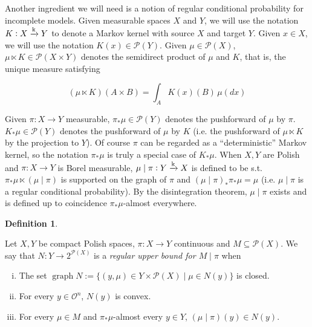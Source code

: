 \documentclass[11pt]{article}
\theoremstyle{definition}
\newtheorem{definition}{Definition}%
\theoremstyle{plain}
\newcommand{\M}{\xrightarrow{\textnormal{k}}}
\DeclareMathOperator{\Gr}{graph}
\newcommand{\PM}{\mathcal{P}}
\newcommand{\Ob}{\mathcal{O}}
\begin{document}
Another ingredient we will need is a notion of regular conditional probability for incomplete models. Given measurable spaces $X$ and $Y$, we will use the notation $K: X \M Y$ to denote a Markov kernel with source $X$ and target $Y$. Given $x \in X$, we will use the notation $K\left(x\right) \in \PM\left(Y\right)$. Given $\mu \in \PM\left(X\right)$, $\mu \ltimes K \in \PM\left(X \times Y\right)$ denotes the semidirect product of $\mu$ and $K$, that is, the unique measure satisfying

\begin{equation}
(\mu \ltimes K)(A \times B) = \int_A K(x)(B)\, \mu(dx)
\end{equation} 

Given $\pi:X\rightarrow Y$ measurable, $\pi_*\mu\in\PM(Y)$ denotes the pushforward of $\mu$ by $\pi$. $K_* \mu \in \PM\left(Y\right)$ denotes the pushforward of $\mu$ by $K$ (i.e. the pushforward of $\mu \ltimes K$ by the projection to $Y$). Of course $\pi$ can be regarded as a \enquote{deterministic} Markov kernel, so the notation $\pi_*\mu$ is truly a special case of $K_*\mu$. When $X,Y$ are Polish and $\pi: X \rightarrow Y$ is Borel measurable, $\mu \mid \pi: Y \M X$ is defined to be s.t. $\pi_* \mu \ltimes \left(\mu \mid \pi\right)$ is supported on the graph of $\pi$ and $\left(\mu \mid \pi\right)_* \pi_* \mu = \mu$ (i.e. $\mu \mid \pi$ is a regular conditional probability). By the disintegration theorem, $\mu \mid \pi$ exists and is defined up to coincidence $\pi_* \mu$-almost everywhere.

\begin{samepage}
\begin{definition}
\label{def:update_incomplete}

Let $X,Y$ be compact Polish spaces, $\pi: X \rightarrow Y$ continuous and $M \subseteq \PM(X)$. We say that $N: Y \rightarrow 2^{\PM(X)}$ is a \emph{regular upper bound for $M \mid \pi$} when 
%
\begin{enumerate}[i.]
\item\label{con:def__update_incomplete__clos} The set $\Gr{N}:=\{(y,\mu)\in Y\times\PM(X) \mid \mu \in N(y)\}$ is closed.
\item\label{con:def__update_incomplete__conv} For every $y \in \Ob^n$, $N(y)$ is convex.
\item\label{con:def__update_incomplete__cond} For every $\mu \in M$ and $\pi_*\mu$-almost every $y \in Y$, $(\mu \mid \pi)(y) \in N(y)$.
\end{enumerate}

\end{definition}
\end{samepage}
\end{document}

